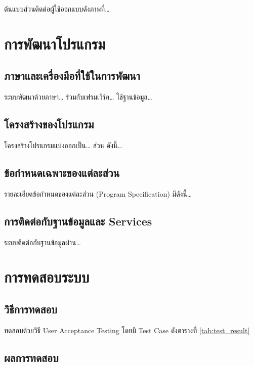 ต้นแบบส่วนติดต่อผู้ใช้ออกแบบดังภาพที่\ldots{}

\section{การพัฒนาโปรแกรม}

\subsection{ภาษาและเครื่องมือที่ใช้ในการพัฒนา}

ระบบพัฒนาด้วยภาษา\ldots{} ร่วมกับเฟรมเวิร์ค\ldots{} ใช้ฐานข้อมูล\ldots{}

\subsection{โครงสร้างของโปรแกรม}

โครงสร้างโปรแกรมแบ่งออกเป็น\ldots{} ส่วน ดังนี้\ldots{}

\subsection{ข้อกำหนดเฉพาะของแต่ละส่วน}

รายละเอียดข้อกำหนดของแต่ละส่วน (Program Specification) มีดังนี้\ldots{}

\subsection{การติดต่อกับฐานข้อมูลและ Services}

ระบบติดต่อกับฐานข้อมูลผ่าน\ldots{}

\section{การทดสอบระบบ}

\subsection{วิธีการทดสอบ}

ทดสอบด้วยวิธี User Acceptance Testing โดยมี Test Case ดังตารางที่ \ref{tab:test_result}

\subsection{ผลการทดสอบ}

